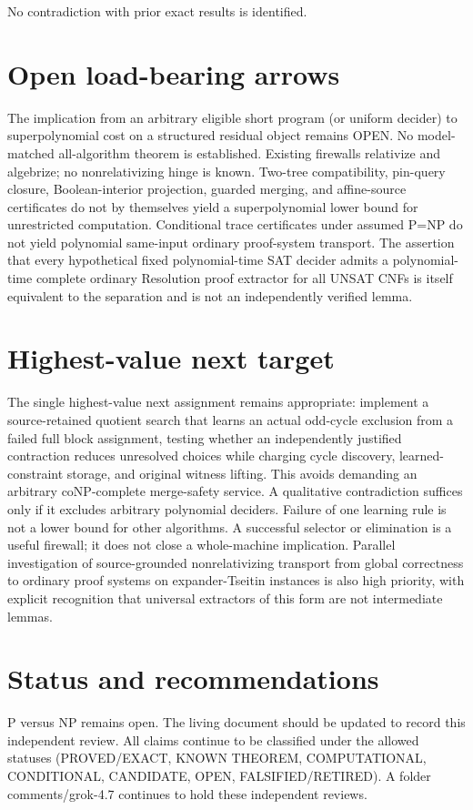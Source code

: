 \documentclass[11pt]{article}
\begin{document}
No contradiction with prior exact results is identified.

\section{Open load-bearing arrows}
The implication from an arbitrary eligible short program (or uniform decider) to superpolynomial cost on a structured residual object remains OPEN. No model-matched all-algorithm theorem is established. Existing firewalls relativize and algebrize; no nonrelativizing hinge is known. Two-tree compatibility, pin-query closure, Boolean-interior projection, guarded merging, and affine-source certificates do not by themselves yield a superpolynomial lower bound for unrestricted computation. Conditional trace certificates under assumed P=NP do not yield polynomial same-input ordinary proof-system transport. The assertion that every hypothetical fixed polynomial-time SAT decider admits a polynomial-time complete ordinary Resolution proof extractor for all UNSAT CNFs is itself equivalent to the separation and is not an independently verified lemma.

\section{Highest-value next target}
The single highest-value next assignment remains appropriate: implement a source-retained quotient search that learns an actual odd-cycle exclusion from a failed full block assignment, testing whether an independently justified contraction reduces unresolved choices while charging cycle discovery, learned-constraint storage, and original witness lifting. This avoids demanding an arbitrary coNP-complete merge-safety service. A qualitative contradiction suffices only if it excludes arbitrary polynomial deciders. Failure of one learning rule is not a lower bound for other algorithms. A successful selector or elimination is a useful firewall; it does not close a whole-machine implication. Parallel investigation of source-grounded nonrelativizing transport from global correctness to ordinary proof systems on expander-Tseitin instances is also high priority, with explicit recognition that universal extractors of this form are not intermediate lemmas.

\section{Status and recommendations}
P versus NP remains open. The living document should be updated to record this independent review. All claims continue to be classified under the allowed statuses (PROVED/EXACT, KNOWN THEOREM, COMPUTATIONAL, CONDITIONAL, CANDIDATE, OPEN, FALSIFIED/RETIRED). A folder comments/grok-4.7 continues to hold these independent reviews.

\end{document}
